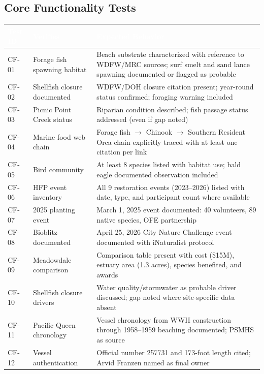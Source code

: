 \documentclass[11pt,letterpaper]{article}
\newcommand{\tableheader}[1]{\textbf{\sffamily\textcolor{white}{#1}}}
\begin{document}
\subsection{Core Functionality Tests}

\begin{center}
\begin{tabularx}{\textwidth}{L{1.5cm}L{3.5cm}X}
\toprule
{}
\tableheader{Test ID} & \tableheader{Verifies} & \tableheader{Expected Behavior} \\
\midrule
CF-01 & Forage fish spawning habitat & Beach substrate characterized with reference to WDFW/MRC sources; surf smelt and sand lance spawning documented or flagged as probable \\
CF-02 & Shellfish closure documented & WDFW/DOH closure citation present; year-round status confirmed; foraging warning included \\
CF-03 & Picnic Point Creek status & Riparian condition described; fish passage status addressed (even if gap noted) \\
CF-04 & Marine food web chain & Forage fish $\rightarrow$ Chinook $\rightarrow$ Southern Resident Orca chain explicitly traced with at least one citation per link \\
CF-05 & Bird community & At least 8 species listed with habitat use; bald eagle documented observation included \\
CF-06 & HFP event inventory & All 9 restoration events (2023--2026) listed with date, type, and participant count where available \\
CF-07 & 2025 planting event & March 1, 2025 event documented: 40 volunteers, 89 native species, OFE partnership \\
CF-08 & Bioblitz documented & April 25, 2026 City Nature Challenge event documented with iNaturalist protocol \\
CF-09 & Meadowdale comparison & Comparison table present with cost (\$15M), estuary area (1.3 acres), species benefited, and awards \\
CF-10 & Shellfish closure drivers & Water quality/stormwater as probable driver discussed; gap noted where site-specific data absent \\
CF-11 & Pacific Queen chronology & Vessel chronology from WWII construction through 1958--1959 beaching documented; PSMHS as source \\
CF-12 & Vessel authentication & Official number 257731 and 173-foot length cited; Arvid Franzen named as final owner \\

\end{tabularx}
\end{center}
\end{document}

